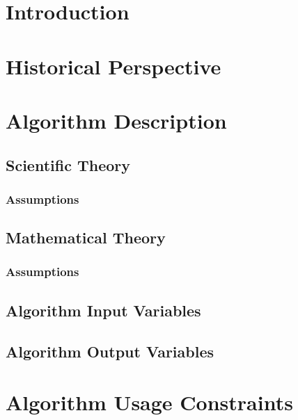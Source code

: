 \section{Introduction}
\Introduction

\section{Historical Perspective}
\HistoricalPerspective

\section{Algorithm Description}
\AlgDesc

\subsection{Scientific Theory}
\ScientificTheory

\subsubsection{Assumptions}
\ScientificTheoryAssumptions

\subsection{Mathematical Theory}
\MathematicalTheory

\subsubsection{Assumptions}
\MathematicalTheoryAssumptions

\subsection{Algorithm Input Variables}
\AlgorithmInputVariables

\subsection{Algorithm Output Variables}
\AlgorithmOutputVariables

\section{Algorithm Usage Constraints}
\AlgorithmUsageConstraints





  